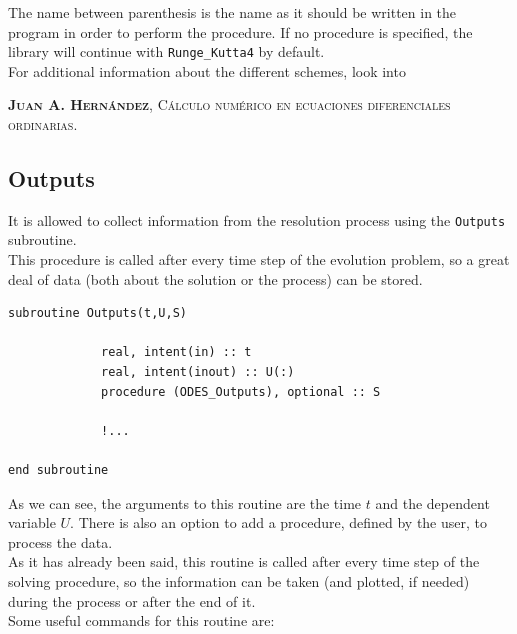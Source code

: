 The name between parenthesis is the name as it should be written in the
program in order to perform the procedure. If no procedure is specified, the
library will continue with \texttt{Runge\_Kutta4} by default. \\

For additional information about the different schemes, look into

 \textsc{\textbf{Juan A. Hern\'andez}, C\'alculo num\'erico en ecuaciones
 diferenciales ordinarias.}

\subsection{Outputs}

It is allowed to collect information from the resolution process using the
\texttt{Outputs} subroutine. \\

This procedure is called after every time step of the evolution problem, so a
great deal of data (both about the solution or the process) can be stored.\\

\begin {blueframed}
\begin{lstlisting}
subroutine Outputs(t,U,S)

             real, intent(in) :: t
             real, intent(inout) :: U(:)
             procedure (ODES_Outputs), optional :: S
             
             !...
             
end subroutine
\end{lstlisting}
\end{blueframed}

As we can see, the arguments to this routine are the time $t$ and the dependent
variable $U$. There is also an option to add a procedure, defined by the user,
to process the data. \\

As it has already been said, this routine is called after every time step of the
solving procedure, so the information can be taken (and plotted, if needed)
during the process or after the end of it. \\

Some useful commands for this routine are: 

